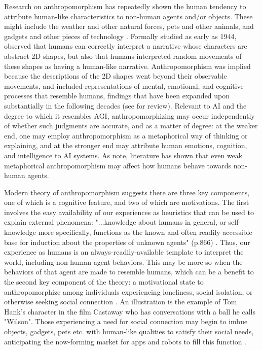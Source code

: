 \documentclass{article}
\theoremstyle{plain}
\theoremstyle{definition}
\theoremstyle{remark}
\begin{document}
Research on anthropomorphism has repeatedly shown the human tendency to attribute human-like characteristics to non-human agents and/or objects. These might include the weather and other natural forces, pets and other animals, and gadgets and other pieces of technology \cite{epley2007seeing}. Formally studied as early as 1944, \cite{heider1944experimental} observed that humans can correctly interpret a narrative whose characters are abstract 2D shapes, but also that humans interpreted random movements of these shapes as having a human-like narrative. Anthropomorphism was implied because the descriptions of the 2D shapes went beyond their observable movements, and included representations of mental, emotional, and cognitive processes that resemble humans, findings that have been expanded upon substantially in the following decades (see \cite{epley2007seeing} for review). 
Relevant to AI and the degree to which it resembles AGI, anthropomorphizing may occur independently of whether such judgments are accurate, and as a matter of degree: at the weaker end, one may employ anthropomorphism as a metaphorical way of thinking or explaining, and at the stronger end may attribute human emotions, cognition, and intelligence to AI systems. As \cite{epley2007seeing} note, literature has shown that even weak metaphorical anthropomorphism may affect how humans behave towards non-human agents.

Modern theory of anthropomorphism suggests there are three key components, one of which is a cognitive feature, and two of which are motivations. The first involves the easy availability of our experiences as heuristics that can be used to explain external phenomena: "...knowledge about humans in general, or self-knowledge more specifically, functions as the known and often readily accessible base for induction about the properties of unknown agents" (p.866) \cite{epley2007seeing, waytz2010social}. Thus, our experience as humans is an always-readily-available template to interpret the world, including non-human agent behaviors. This may be more so when the behaviors of that agent are made to resemble humans, which can be a benefit to the second key component of the theory: a motivational state to anthropomorphize among individuals experiencing loneliness, social isolation, or otherwise seeking social connection \cite{epley2007seeing, waytz2010social}. An illustration is the example of Tom Hank's character in the film Castaway who has conversations with a ball he calls "Wilson". Those experiencing a need for social connection may begin to imbue objects, gadgets, pets etc. with human-like qualities to satisfy their social needs, anticipating the now-forming market for apps and robots to fill this function \cite{salles2020anthropomorphism}. 
\end{document}
